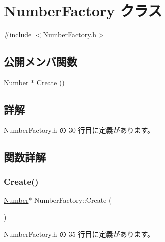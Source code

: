 \hypertarget{class_number_factory}{}\section{Number\+Factory クラス}
\label{class_number_factory}


{\ttfamily \#include $<$Number\+Factory.\+h$>$}

\subsection*{公開メンバ関数}
\begin{DoxyCompactItemize}
\item 
\mbox{\hyperlink{class_number}{Number}} $\ast$ \mbox{\hyperlink{class_number_factory_aace5458332c982b3f12265abaf5a3308}{Create}} ()
\end{DoxyCompactItemize}


\subsection{詳解}


 Number\+Factory.\+h の 30 行目に定義があります。



\subsection{関数詳解}
\mbox{\label{class_number_factory_aace5458332c982b3f12265abaf5a3308}} 
\subsubsection{\texorpdfstring{Create()}{Create()}}
{\footnotesize\ttfamily \mbox{\hyperlink{class_number}{Number}}$\ast$ Number\+Factory\+::\+Create (\begin{DoxyParamCaption}{ }\end{DoxyParamCaption})\hspace{0.3cm}{\ttfamily [inline]}}



 Number\+Factory.\+h の 35 行目に定義があります。

